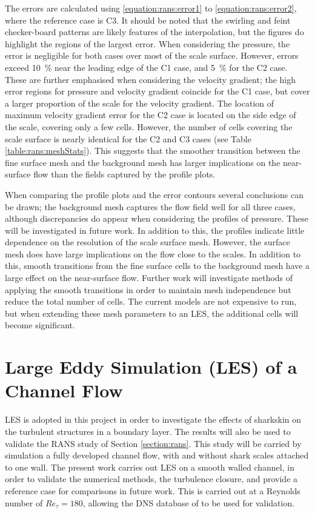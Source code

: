 \documentclass[12pt,oneside,a4paper]{article}
\begin{document}
 The errors are calculated using \eqref{equation:rans:error1} to \eqref{equation:rans:error2}, where the reference case is C3. It should be noted that the swirling and feint checker-board patterns are likely features of the interpolation, but the figures do highlight the regions of the largest error. When considering the pressure, the error is negligible for both cases over most of the scale surface. However, errors exceed \SI{10}{\%} near the leading edge of the C1 case, and \SI{5}{\%} for the C2 case. These are further emphasised when considering the velocity gradient; the high error regions for pressure and velocity gradient coincide for the C1 case, but cover a larger proportion of the scale for the velocity gradient. The location of maximum velocity gradient error for the C2 case is located on the side edge of the scale, covering only a few cells. However, the number of cells covering the scale surface is nearly identical for the C2 and C3 cases (see Table \ref{table:rans:meshStats}). This suggests that the smoother transition between the fine surface mesh and the background mesh has larger implications on the near-surface flow than the fields captured by the profile plots. 
 
When comparing the profile plots and the error contours several conclusions can be drawn; the background mesh captures the flow field well for all three cases, although discrepancies do appear when considering the profiles of pressure. These will be investigated in future work. In addition to this, the profiles indicate little dependence on the resolution of the scale surface mesh. However, the surface mesh does have large implications on the flow close to the scales. In addition to this, smooth transitions from the fine surface cells to the background mesh have a large effect on the near-surface flow. Further  work will investigate methods of applying the smooth transitions in order to maintain mesh independence but reduce the total number of cells. The current models are not expensive to run, but when extending these mesh parameters to an LES, the additional cells will become significant. 

\newpage
\section{Large Eddy Simulation (LES) of a Channel Flow}
\label{section:les}
LES is adopted in this project in order to investigate the effects of sharkskin on the turbulent structures in a boundary layer. The results will also be used to validate the RANS study of Section \ref{section:rans}. This study will be carried by simulation a fully developed channel flow, with and without shark scales attached to one wall. The present work carries out LES on a smooth walled channel, in order to validate the numerical methods, the turbulence closure, and provide a reference case for comparisons in future work. This is carried out at a Reynolds number of $Re_\tau=180$, allowing the DNS database of \cite{vreman2014} to be used for validation. 
\end{document}
